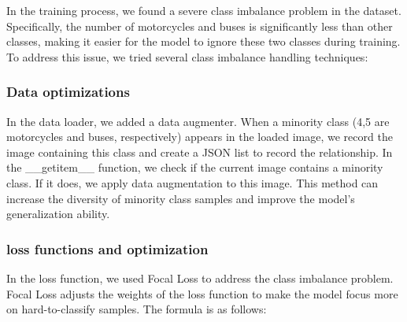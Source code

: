 \documentclass[conference]{IEEEtran}
\begin{document}



In the training process, we found a severe class imbalance problem in the dataset. Specifically, the number of motorcycles and buses is significantly less than other classes, making it easier for the model to ignore these two classes during training. To address this issue, we tried several class imbalance handling techniques:

\subsubsection{Data optimizations}


In the data loader, we added a data augmenter. When a minority class (4,5 are motorcycles and buses, respectively) appears in the loaded image, we record the image containing this class and create a JSON list to record the relationship. In the \_\_getitem\_\_ function, we check if the current image contains a minority class. If it does, we apply data augmentation to this image. This method can increase the diversity of minority class samples and improve the model's generalization ability.


\subsubsection{loss functions and optimization}


In the loss function, we used Focal Loss to address the class imbalance problem. Focal Loss adjusts the weights of the loss function to make the model focus more on hard-to-classify samples. The formula is as follows:
\end{document}

